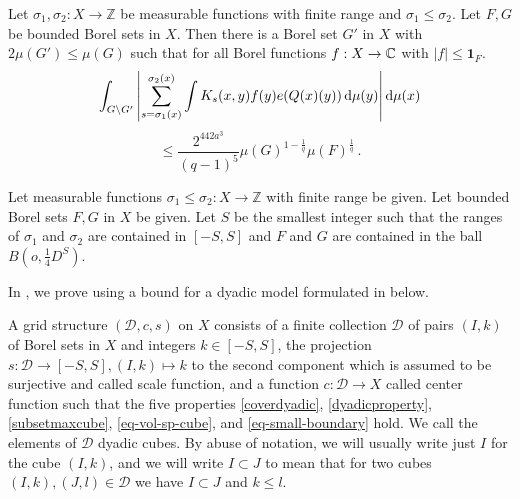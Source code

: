 \begin{proposition}
\label{finitary-Carleson}
\leanok
{}
Let ${\sigma_1},\sigma_2\colon X\to \mathbb{Z}$ be measurable functions with finite range and ${\sigma_1}\leq \sigma_2$.  Let $F,G$ be bounded Borel sets in $X$. Then there is a Borel set $G'$ in $X$ with $2\mu(G')\leq \mu(G)$ such that
for all Borel functions $f:X\to \mathbb{C}$ with $|f|\le \mathbf{1}_F$.
\begin{equation*}
    \int_{G \setminus G'} \left|\sum_{s={\sigma_1}(x)}^{{\sigma_2}(x)} \int K_s(x,y) f(y) e({Q}(x)(y)) \, \mathrm{d}\mu(y) \right| \mathrm{d}\mu(x)
\end{equation*}
\begin{equation}
    \label{eq-linearized}
    \le \frac{2^{442a^3}}{(q-1)^5} \mu(G)^{1-\frac{1}{q}} \mu(F)^{\frac 1 q}\,.
\end{equation}
\end{proposition}
Let measurable functions ${\sigma_1}\leq \sigma_2\colon X\to \mathbb{Z}$ with finite range be given.
Let bounded Borel sets $F,G$ in $X$ be given.
Let $S$ be the smallest integer such that the ranges of
$\sigma_1$ and $\sigma_2$ are contained in $[-S,S]$ and $F$ and $G$ are contained
in the ball $B(o, \frac{1}{4}D^S)$.

In , we prove  using a
bound for a dyadic model formulated in  below.

A grid structure $(\mathcal{D}, c, s)$ on $X$ consists of a finite collection $\mathcal{D}$ of pairs $(I, k)$ of Borel
sets in $X$ and integers $k \in [-S, S]$, the projection $s\colon \mathcal{D}\to [-S, S], (I, k) \mapsto k$ to the second component which is assumed to be surjective and
called scale function, and a function $c:\mathcal{D}\to X$
called center function such that the five properties
\eqref{coverdyadic}, \eqref{dyadicproperty}, \eqref{subsetmaxcube},
\eqref{eq-vol-sp-cube}, and \eqref{eq-small-boundary} hold. We call the elements of $\mathcal{D}$ dyadic cubes. By abuse of notation, we will usually write just $I$ for the cube $(I,k)$, and we will write $I \subset J$ to mean that for two cubes $(I,k), (J, l) \in \mathcal{D}$ we have $I \subset J$ and $k \le l$.

